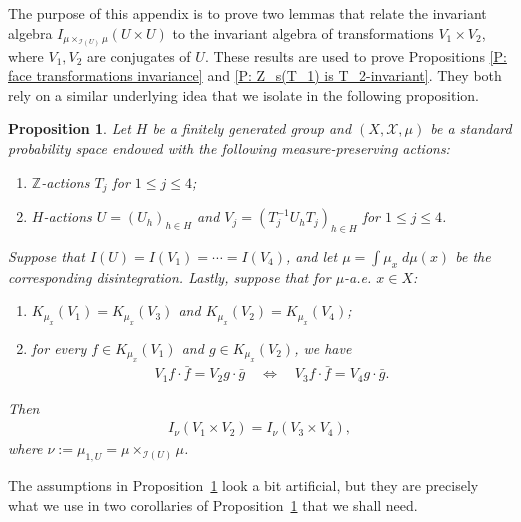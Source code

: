 \documentclass[11pt]{amsart}
\newtheorem{proposition}[lemma]{Proposition}
\theoremstyle{definition}
\newcommand{\Z}{{\mathbb Z}}
\newcommand{\CI}{{\mathcal I}}
\newcommand{\CX}{{\mathcal X}}
\newcommand{\inv}{^{-1}}
\newcommand{\1}{{\mathbf{1}}}
\begin{document}
The purpose of this appendix is to prove two lemmas that relate the invariant algebra $I_{\mu\times_{\CI(U)}\mu}(U\times U)$ to the invariant algebra of transformations $V_1\times V_2$, where $V_1, V_2$ are conjugates of $U$. These results are used to prove Propositions \ref{P: face transformations invariance} and \ref{P: Z_s(T_1) is T_2-invariant}. They both rely on a similar underlying idea that we isolate in the following proposition.
\begin{proposition}\label{P: equal invariant factors}
    Let $H$ be a finitely generated group and $(X, \CX, \mu)$ be a standard probability space endowed with the following measure-preserving actions:
    \begin{enumerate}
        \item $\Z$-actions $T_j$ for $1\leq j\leq 4$;
        \item $H$-actions $U = (U_h)_{h\in H}$ and $V_j = (T_j\inv U_h T_j)_{h\in H}$ for $1\leq j\leq 4$.
    \end{enumerate}
    Suppose that $I(U) = I(V_1) = \cdots =  I(V_4)$, and let $\mu = \int \mu_x\; d\mu(x)$ be the corresponding disintegration. Lastly, suppose that for $\mu$-a.e. $x\in X$:
    \begin{enumerate}
        \item $K_{\mu_x}(V_1) = K_{\mu_x}(V_3)$ and $K_{\mu_x}(V_2) = K_{\mu_x}(V_4)$;
        \item for every $f\in K_{\mu_x}(V_1)$ and $g\in K_{\mu_x}(V_2)$, we have
        \begin{align}\label{E: same eigenvalues}
         V_1 f\cdot \bar f = V_2 g\cdot \bar g\quad \iff\quad V_3 f\cdot \bar f = V_4 g\cdot \bar g .  
        \end{align}
    \end{enumerate}
    Then
    \begin{align*}
        I_{\nu}(V_1\times V_2) = I_\nu(V_3\times V_4),
    \end{align*}
    where $\nu:=\mu_{1,U} = \mu\times_{\CI(U)}\mu$.
\end{proposition}
The assumptions in Proposition~\ref{P: equal invariant factors} look a bit artificial, but they are precisely what we use in two corollaries of Proposition~\ref{P: equal invariant factors} that we shall need.
\end{document}
